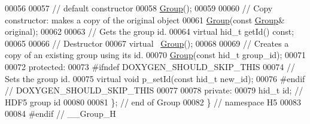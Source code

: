 \begin{DoxyCode}
00056 
00057         \textcolor{comment}{// default constructor}
00058         \hyperlink{class_h5_1_1_group}{Group}();
00059 
00060         \textcolor{comment}{// Copy constructor: makes a copy of the original object}
00061         \hyperlink{class_h5_1_1_group}{Group}(\textcolor{keyword}{const} \hyperlink{class_h5_1_1_group}{Group}& original);
00062 
00063         \textcolor{comment}{// Gets the group id.}
00064         \textcolor{keyword}{virtual} hid\_t getId() \textcolor{keyword}{const};
00065 
00066         \textcolor{comment}{// Destructor}
00067         \textcolor{keyword}{virtual} ~\hyperlink{class_h5_1_1_group}{Group}();
00068 
00069         \textcolor{comment}{// Creates a copy of an existing group using its id.}
00070         \hyperlink{class_h5_1_1_group}{Group}(\textcolor{keyword}{const} hid\_t group\_id);
00071 
00072    \textcolor{keyword}{protected}:
00073 \textcolor{preprocessor}{#ifndef DOXYGEN\_SHOULD\_SKIP\_THIS}
00074         \textcolor{comment}{// Sets the group id.}
00075         \textcolor{keyword}{virtual} \textcolor{keywordtype}{void} p\_setId(\textcolor{keyword}{const} hid\_t new\_id);
00076 \textcolor{preprocessor}{#endif // DOXYGEN\_SHOULD\_SKIP\_THIS}
00077 
00078    \textcolor{keyword}{private}:
00079         hid\_t id;    \textcolor{comment}{// HDF5 group id}
00080 
00081 \}; \textcolor{comment}{// end of Group}
00082 \} \textcolor{comment}{// namespace H5}
00083 
00084 \textcolor{preprocessor}{#endif // \_\_Group\_H}
\end{DoxyCode}
